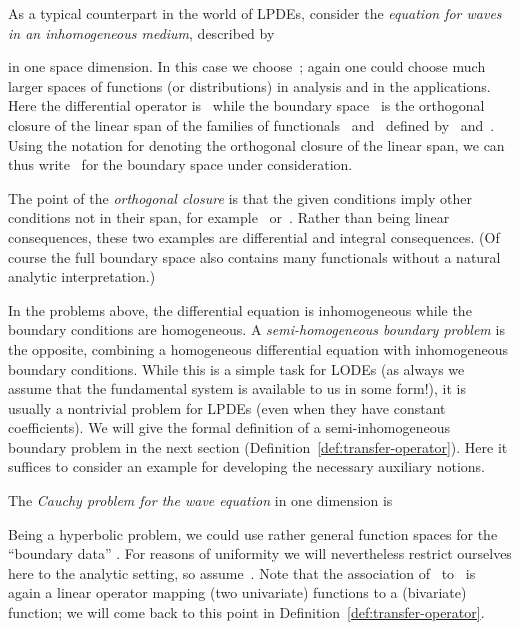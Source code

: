 \documentclass[a4paper]{llncs}
\begin{document}
\begin{myexample}
  \label{ex:wave-inhom-medium}
  As a typical counterpart in the world of LPDEs, consider the
  \emph{equation for waves in an inhomogeneous medium}, described by

in one space dimension. In this case we choose~; again one could choose much larger spaces of functions (or
  distributions) in analysis and in the applications. Here the differential
  operator is~ while the boundary space~ is the orthogonal
  closure of the linear span of the families of functionals~ and~ defined
  by~ and~. Using the notation  for denoting the
  orthogonal closure of the linear span, we can thus write~ for the
  boundary space under consideration.

  The point of the \emph{orthogonal closure} is that the given conditions imply
  other conditions not in their span, for example~
  or~. Rather than being linear
  consequences, these two examples are differential and integral
  consequences. (Of course the full boundary space also contains many
  functionals without a natural analytic interpretation.)
\end{myexample}

In the problems above, the differential equation is inhomogeneous while the
boundary conditions are homogeneous. A \emph{semi-homogeneous boundary problem}
is the opposite, combining a homogeneous differential equation with
inhomogeneous boundary conditions. While this is a simple task for LODEs (as
always we assume that the fundamental system is available to us in some form!),
it is usually a nontrivial problem for LPDEs (even when they have constant
coefficients). We will give the formal definition of a semi-inhomogeneous
boundary problem in the next section
(Definition~\ref{def:transfer-operator}). Here it suffices to consider an
example for developing the necessary auxiliary notions.

\begin{myexample}
  \label{ex:cauchy-wave-eq}
  The \emph{Cauchy problem for the wave equation} in one dimension is

Being a hyperbolic problem, we could use rather general function spaces for
  the ``boundary data'' . For reasons of uniformity we will nevertheless
  restrict ourselves here to the analytic setting, so assume~. Note that the association of~ to~ is again a linear
  operator mapping (two univariate) functions to a (bivariate) function; we will
  come back to this point in Definition~\ref{def:transfer-operator}.
\end{myexample}
\end{document}
